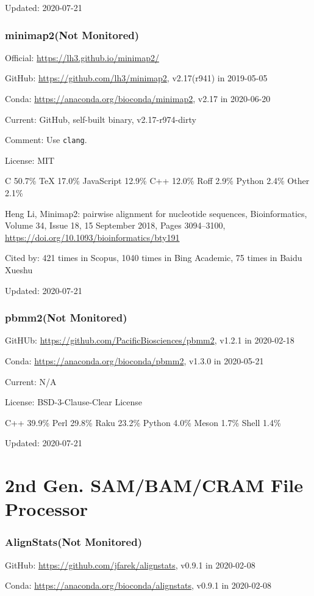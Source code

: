 \documentclass[]{article}
\newcommand{\nm}{{\color{red}(Not Monitored)}}
\newcommand{\cb}[3]{\par Cited by: {\color{blue}\Huge #1} times in Scopus, {\color{blue}\Huge #2} times in Bing Academic, {\color{blue}\Huge #3} times in Baidu Xueshu}
\begin{document}
Updated: 2020-07-21

\section{minimap2\nm}

Official: \url{https://lh3.github.io/minimap2/}

GitHub: \url{https://github.com/lh3/minimap2}, v2.17(r941) in 2019-05-05

Conda: \url{https://anaconda.org/bioconda/minimap2}, v2.17 in 2020-06-20

Current: GitHub, self-built binary, v2.17-r974-dirty

Comment: Use \verb|clang|.

License: MIT

C 50.7\% TeX 17.0\% JavaScript 12.9\% C++ 12.0\% Roff 2.9\% Python 2.4\% Other 2.1\%

Heng Li, Minimap2: pairwise alignment for nucleotide sequences, Bioinformatics, Volume 34, Issue 18, 15 September 2018, Pages 3094–3100, \url{https://doi.org/10.1093/bioinformatics/bty191}\cb{421}{1040}{75}

Updated: 2020-07-21

\section{pbmm2\nm}

GitHUb: \url{https://github.com/PacificBiosciences/pbmm2}, v1.2.1 in 2020-02-18

Conda: \url{https://anaconda.org/bioconda/pbmm2}, v1.3.0 in 2020-05-21

Current: N/A

License: BSD-3-Clause-Clear License

C++ 39.9\% Perl 29.8\% Raku 23.2\% Python 4.0\% Meson 1.7\% Shell 1.4\%

Updated: 2020-07-21

\part{2nd Gen. SAM/BAM/CRAM File Processor}

\section{AlignStats\nm}

GitHub: \url{https://github.com/jfarek/alignstats}, v0.9.1 in 2020-02-08

Conda: \url{https://anaconda.org/bioconda/alignstats}, v0.9.1 in 2020-02-08
\end{document}
